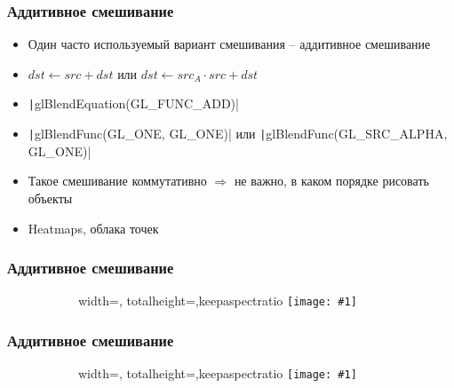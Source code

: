 \documentclass[10pt]{beamer}
\newcommand{\slideimage}[1]{
  \begin{figure}
    \begin{adjustbox}{width=\textwidth, totalheight=\textheight-2\baselineskip-2\baselineskip,keepaspectratio}
      \texttt{[image: \#1]}
    \end{adjustbox}
  \end{figure}
}
\begin{document}
\begin{frame}[fragile]
\frametitle{Аддитивное смешивание}
\begin{itemize}
\item Один часто используемый вариант смешивания -- аддитивное смешивание
\item \begin{math}dst \leftarrow src + dst\end{math} или \begin{math}dst \leftarrow src_A \cdot src + dst\end{math}
\pause
\item \texttt|glBlendEquation(GL_FUNC_ADD)|
\item \texttt|glBlendFunc(GL_ONE, GL_ONE)| или \texttt|glBlendFunc(GL_SRC_ALPHA, GL_ONE)|
\pause
\item Такое смешивание коммутативно \begin{math}\Longrightarrow\end{math} не важно, в каком порядке рисовать объекты
\pause
\item Heatmaps, облака точек
\end{itemize}
\end{frame}

\begin{frame}
\frametitle{Аддитивное смешивание}
\begin{figure}
\slideimage{heatmap.jpg}
\end{figure}
\end{frame}

\begin{frame}
\frametitle{Аддитивное смешивание}
\begin{figure}
\slideimage{galaxy.jpg}
\end{figure}
\end{frame}
\end{document}

